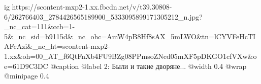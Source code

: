  
 
 
 
 

\ifcmt
  ig https://scontent-mxp2-1.xx.fbcdn.net/v/t39.30808-6/262766403_2784426565189900_5333095899171305212_n.jpg?_nc_cat=111&ccb=1-5&_nc_sid=b9115d&_nc_ohc=AmW4pB8Hf8sAX_5mLWO&tn=lCYVFeHcTIAFcAzi&_nc_ht=scontent-mxp2-1.xx&oh=00_AT_f6QtFnXb4FU9BZg08PPmsoZNcd05mXF5pDKGO1cfVXw&oe=61D9C3DC
  @caption @label 2: Были и такие дворяне...
	@width 0.4
  @wrap \parpic[r]
  @minipage 0.4
\fi

